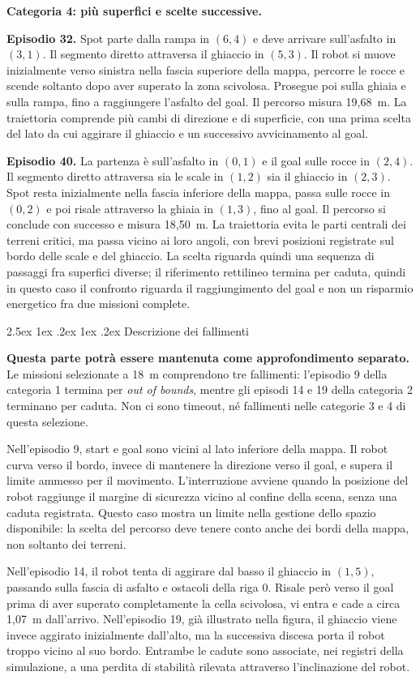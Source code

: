 \documentclass[11pt,a4paper]{article}
\makeatletter
\newcommand{\subsubsubsection}{%
  \@startsection{paragraph}{4}{\z@}%
  {2.5ex \@plus 1ex \@minus .2ex}%
  {1ex \@plus .2ex}%
  {\normalfont\normalsize\bfseries}}
\makeatother
\begin{document}
\textbf{Categoria 4: più superfici e scelte successive.}

\textbf{Episodio 32.} Spot parte dalla rampa in $(6,4)$ e deve arrivare sull'asfalto in $(3,1)$. Il segmento diretto attraversa il ghiaccio in $(5,3)$. Il robot si muove inizialmente verso sinistra nella fascia superiore della mappa, percorre le rocce e scende soltanto dopo aver superato la zona scivolosa. Prosegue poi sulla ghiaia e sulla rampa, fino a raggiungere l'asfalto del goal. Il percorso misura 19,68~m. La traiettoria comprende più cambi di direzione e di superficie, con una prima scelta del lato da cui aggirare il ghiaccio e un successivo avvicinamento al goal.

\textbf{Episodio 40.} La partenza è sull'asfalto in $(0,1)$ e il goal sulle rocce in $(2,4)$. Il segmento diretto attraversa sia le scale in $(1,2)$ sia il ghiaccio in $(2,3)$. Spot resta inizialmente nella fascia inferiore della mappa, passa sulle rocce in $(0,2)$ e poi risale attraverso la ghiaia in $(1,3)$, fino al goal. Il percorso si conclude con successo e misura 18,50~m. La traiettoria evita le parti centrali dei terreni critici, ma passa vicino ai loro angoli, con brevi posizioni registrate sul bordo delle scale e del ghiaccio. La scelta riguarda quindi una sequenza di passaggi fra superfici diverse; il riferimento rettilineo termina per caduta, quindi in questo caso il confronto riguarda il raggiungimento del goal e non un risparmio energetico fra due missioni complete.

\subsubsubsection{Descrizione dei fallimenti}

\textbf{Questa parte potrà essere mantenuta come approfondimento separato.} Le missioni selezionate a 18~m comprendono tre fallimenti: l'episodio 9 della categoria 1 termina per \textit{out of bounds}, mentre gli episodi 14 e 19 della categoria 2 terminano per caduta. Non ci sono timeout, né fallimenti nelle categorie 3 e 4 di questa selezione.

Nell'episodio 9, start e goal sono vicini al lato inferiore della mappa. Il robot curva verso il bordo, invece di mantenere la direzione verso il goal, e supera il limite ammesso per il movimento. L'interruzione avviene quando la posizione del robot raggiunge il margine di sicurezza vicino al confine della scena, senza una caduta registrata. Questo caso mostra un limite nella gestione dello spazio disponibile: la scelta del percorso deve tenere conto anche dei bordi della mappa, non soltanto dei terreni.

Nell'episodio 14, il robot tenta di aggirare dal basso il ghiaccio in $(1,5)$, passando sulla fascia di asfalto e ostacoli della riga 0. Risale però verso il goal prima di aver superato completamente la cella scivolosa, vi entra e cade a circa 1,07~m dall'arrivo. Nell'episodio 19, già illustrato nella figura, il ghiaccio viene invece aggirato inizialmente dall'alto, ma la successiva discesa porta il robot troppo vicino al suo bordo. Entrambe le cadute sono associate, nei registri della simulazione, a una perdita di stabilità rilevata attraverso l'inclinazione del robot.
\end{document}
